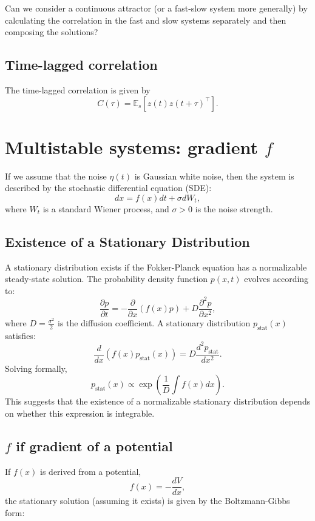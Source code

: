 \documentclass{article}
\theoremstyle{definition} \newtheorem{definition}{Definition}
\theoremstyle{remark} \newtheorem{remark}{Remark}
\newcounter{ct}
\begin{document}
Can we consider a continuous attractor (or a fast-slow system more generally) by calculating the correlation in the fast and slow systems separately and then composing the solutions?


\subsection{Time-lagged correlation}
The time-lagged correlation is given by
\[
C(\tau) = \mathbb{E}_s \left[ z(t) z(t + \tau)^\top \right].
\]




\section{Multistable systems: gradient $f$}
If we assume that the noise $\eta(t)$ is Gaussian white noise, then the system is described by the stochastic differential equation (SDE):
\begin{equation}
    dx = f(x)dt + \sigma dW_t,
\end{equation}
where $W_t$ is a standard Wiener process, and $\sigma > 0$ is the noise strength.

\subsection{Existence of a Stationary Distribution}
A stationary distribution exists if the Fokker-Planck equation has a normalizable steady-state solution. The probability density function $p(x,t)$ evolves according to:
\begin{equation}
    \frac{\partial p}{\partial t} = -\frac{\partial}{\partial x} \left( f(x) p \right) + D \frac{\partial^2 p}{\partial x^2},
\end{equation}
where $D = \frac{\sigma^2}{2}$ is the diffusion coefficient. A stationary distribution $p_{\text{stat}}(x)$ satisfies:
\begin{equation}
    \frac{d}{dx} \left( f(x) p_{\text{stat}}(x) \right) = D \frac{d^2 p_{\text{stat}}}{dx^2}.
\end{equation}
Solving formally,
\begin{equation}
    p_{\text{stat}}(x) \propto \exp \left( \frac{1}{D} \int f(x) dx \right).
\end{equation}
This suggests that the existence of a normalizable stationary distribution depends on whether this expression is integrable.

\subsection{$f$ if gradient of a potential}
If $f(x)$ is derived from a potential, 
\[
f(x) = - \frac{dV}{dx},
\]
the stationary solution (assuming it exists) is given by the Boltzmann-Gibbs form:
\end{document}
